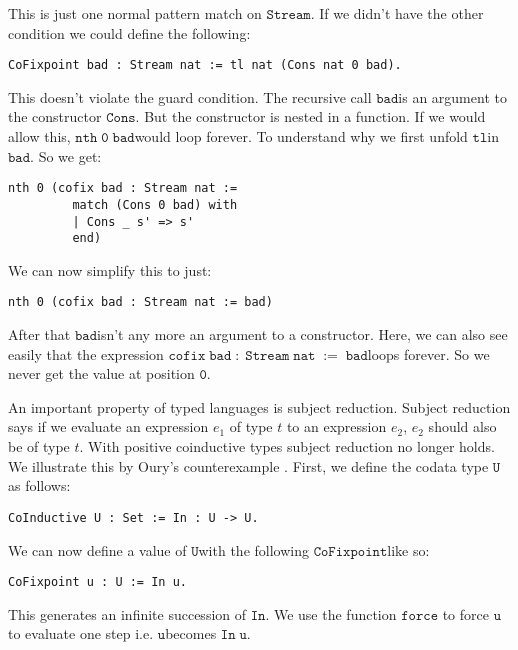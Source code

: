 \documentclass[a4paper,cleardoubleempty,BCOR1cm]{scrbook}
\begin{document}
This is just one normal pattern match on $\mathtt{Stream}$.  If we didn't have the
other condition we could define the following:

\begin{verbatim}
CoFixpoint bad : Stream nat := tl nat (Cons nat 0 bad).
\end{verbatim}

This doesn't violate the guard condition.  The recursive call $\mathtt{bad}$\;is an
argument to the constructor $\mathtt{Cons}$.  But the constructor is nested in a
function.  If we would allow this, $\mathtt{nth\;0\;bad}$\;would loop forever.  To
understand why we first unfold $\mathtt{tl}$\;in $\mathtt{bad}$.  So we get:

\begin{verbatim}
nth 0 (cofix bad : Stream nat :=
         match (Cons 0 bad) with
         | Cons _ s' => s'
         end)
\end{verbatim}

We can now simplify this to just:

\begin{verbatim}
nth 0 (cofix bad : Stream nat := bad)
\end{verbatim}

After that $\mathtt{bad}$\;isn't any more an argument to a constructor.  Here, we can also
see easily that the expression $\mathtt{cofix\;bad\;:\;Stream\;nat\;:=\;bad}$\;loops forever.
So we never get the value at position $\mathtt{0}$.

An important property of typed languages is subject reduction. Subject
reduction says if we evaluate an expression \(e_1\) of type \(t\) to an expression
\(e_2\), \(e_2\) should also be of type \(t\). With positive coinductive types subject
reduction no longer holds. We illustrate this by Oury's counterexample
\cite{oury2008}. First, we define the codata type $\mathtt{U}$\;as follows:

\begin{verbatim}
CoInductive U : Set := In : U -> U.
\end{verbatim}

We can now define a value of $\mathtt{U}$\;with the following $\mathtt{CoFixpoint}$\;like so:

\begin{verbatim}
CoFixpoint u : U := In u.
\end{verbatim}

This generates an infinite succession of $\mathtt{In}$.  We use the function $\mathtt{force}$
to force $\mathtt{u}$\;to evaluate one step i.e. $\mathtt{u}$\;becomes $\mathtt{In\;u}$.
\end{document}
